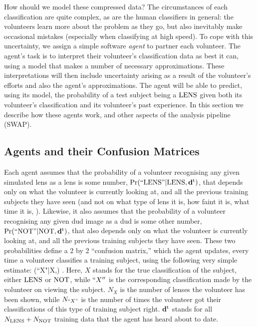 \documentclass[useAMS,usenatbib,a4paper]{mn2e}
\begin{document}
How should we model these compressed data? The circumstances of each
classification are quite complex, as are the human classifiers in general: the
volunteers learn more about the problem as they go, but also inevitably make
occasional mistakes (especially when classifying at high speed).
To cope with this uncertainty, we assign a
simple software {\it agent} to partner each volunteer. The agent's task is to
interpret their volunteer's classification data as best it can, using a model
that makes a number of necessary approximations. These interpretations will
then include uncertainty arising as a result of the volunteer's efforts and
also the agent's approximations.
The agent will be able to predict, using its model, the probability of a test
subject being a ${\rm LENS}$ given both its volunteer's classification and its
volunteer's past experience. In this section we describe how these agents work,
and other aspects of the \SW analysis pipeline (SWAP).


\subsection{Agents and their Confusion Matrices}
\label{sec:swap:details:probabilities}

Each agent assumes that the probability of a volunteer recognising any given
simulated lens as a lens is some number, ${\rm Pr}({\rm ``LENS"}|{\rm LENS},{\mathbf{d}^{\rm t}})$, that
depends only on what the volunteer is currently looking at, and all the
previous training subjects they have seen (and not on what type of lens it is,
how faint it is, what time it is, \etc). Likewise, it also assumes that the
probability of a volunteer recognising any given dud image as a dud is some
other number, ${\rm Pr}({\rm ``NOT"}|{\rm NOT},{\mathbf{d}^{\rm t}})$, that also depends only on what the volunteer is currently looking at, and all the
previous training subjects they have seen. These two probabilities define a
2 by 2 ``confusion matrix,'' which the agent updates, every time a
volunteer classifies a training subject, using the following
very simple estimate:
\be
  \pr(``X"|X,\training) \approx {}.
  \label{eq:app:fraction}
\ee
Here, $X$ stands for the true classification of the subject, \ie either
${\rm LENS}$ or ${\rm NOT}$, while $``X''$ is the corresponding classification
made by the volunteer on viewing the subject. $N_X$ is the number of
lenses the volunteer has been shown, while $N_{``X"}$ is the number of
times the volunteer got their classifications of this type of training subject
right. ${\mathbf{d}^{\rm t}}$ stands for all
$N_{{\rm LENS}} + N_{{\rm NOT}}$ training data that the agent has heard about to
date.
\end{document}
